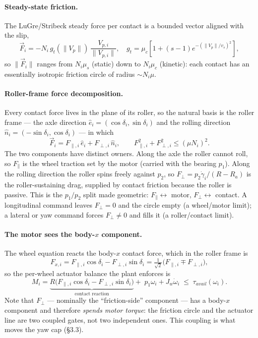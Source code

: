 \documentclass[11pt]{article}
\begin{document}
\paragraph{Steady-state friction.} The LuGre/Stribeck steady force per contact is a bounded
vector aligned with the slip,
\begin{equation}
\vec F_i=-N_i\,g_t(\|V_p\|)\,\frac{V_{p,i}}{\|V_{p,i}\|},\quad
g_t=\mu_c\!\left[1+(s-1)e^{-(\|V_p\|/v_s)^2}\right],
\end{equation}
so $\|\vec F_i\|$ ranges from $N_i\mu_s$ (static) down to $N_i\mu_c$ (kinetic): each contact has
an essentially isotropic friction circle of radius $\sim N_i\mu$.

\paragraph{Roller-frame force decomposition.} Every contact force lives in the plane of its
roller, so the natural basis is the roller frame --- the axle direction
$\hat e_i=(\cos\delta_i,\sin\delta_i)$ and the rolling direction
$\hat n_i=(-\sin\delta_i,\cos\delta_i)$ --- in which
\begin{equation}
\vec F_i=F_{\parallel,i}\,\hat e_i+F_{\perp,i}\,\hat n_i,\qquad
F_{\parallel,i}^2+F_{\perp,i}^2\le(\mu N_i)^2 .
\label{eq:rollerframe}
\end{equation}
The two components have distinct owners. Along the axle the roller cannot roll, so
$F_\parallel$ is the wheel traction set by the motor (carried with the bearing $p_1$). Along the
rolling direction the roller spins freely against $p_2$, so $F_\perp=p_2\dot\gamma_i/(R-R_a)$ is
the roller-sustaining drag, supplied by contact friction because the roller is passive. This is
the $p_1/p_2$ split made geometric: $F_\parallel\leftrightarrow$ motor,
$F_\perp\leftrightarrow$ contact. A longitudinal command leaves $F_\perp=0$ and the circle empty
(a wheel/motor limit); a lateral or yaw command forces $F_\perp\ne0$ and fills it (a
roller/contact limit).

\paragraph{The motor sees the body-$x$ component.} The wheel equation reacts the body-$x$
contact force, which in the roller frame is
\begin{equation}
F_{x,i}=F_{\parallel,i}\cos\delta_i-F_{\perp,i}\sin\delta_i
=\tfrac{1}{\sqrt2}\big(F_{\parallel,i}\mp F_{\perp,i}\big),
\label{eq:Fx}
\end{equation}
so the per-wheel actuator balance the plant enforces is
\begin{equation}
M_i=\underbrace{R\big(F_{\parallel,i}\cos\delta_i-F_{\perp,i}\sin\delta_i\big)}_{\text{contact
reaction}}+\;p_1\omega_i+J_w\dot\omega_i\;\le\;\tau_{avail}(\omega_i).
\label{eq:motorgate}
\end{equation}
Note that $F_\perp$ --- nominally the ``friction-side'' component --- has a body-$x$ component
and therefore \emph{spends motor torque}: the friction circle and the actuator line are two
coupled gates, not two independent ones. This coupling is what moves the yaw cap (\S3.3).
\end{document}
